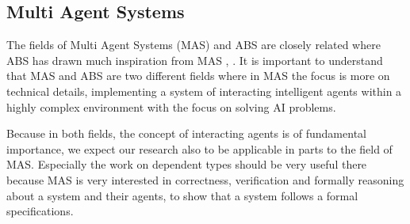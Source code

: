 \subsection{Multi Agent Systems}
The fields of Multi Agent Systems (MAS) and ABS are closely related where ABS has drawn much inspiration from MAS \cite{wooldridge_introduction_2009}, \cite{weiss_multiagent_2013}. It is important to understand that MAS and ABS are two different fields where in MAS the focus is more on technical details, implementing a system of interacting intelligent agents within a highly complex environment with the focus on solving AI problems.

Because in both fields, the concept of interacting agents is of fundamental importance, we expect our research also to be applicable in parts to the field of MAS. Especially the work on dependent types should be very useful there because MAS is very interested in correctness, verification and formally reasoning about a system and their agents, to show that a system follows a formal specifications.
